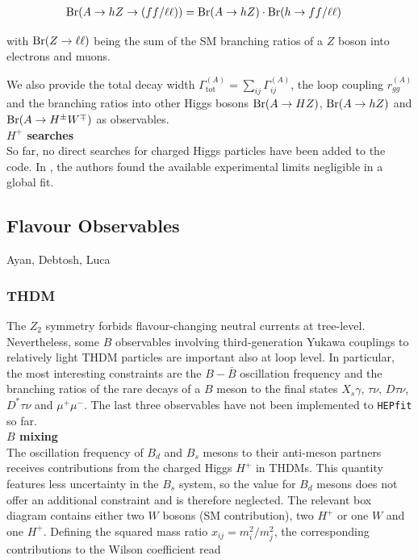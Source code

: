 \documentclass[aps,superscriptaddress,nofootinbib,floatfix,notitlepage]{revtex4-1}
\newcommand{\HEPfit}{\texttt{HEPfit}\xspace}
\begin{document}
\begin{align}
 {\rm Br}(A\to hZ\to (ff / \ell \ell )) &=  {\rm Br}(A\to hZ)  \cdot {\rm Br}(h\to ff / \ell \ell )\nonumber 
\end{align}

with ${\rm Br}(Z\to \ell \ell )$ being the sum of the SM branching ratios of a $Z$ boson into electrons and muons.

We also provide the total decay width $\Gamma^{(A)}_{\text{tot}}=\sum_{ij}\Gamma_{ij}^{(A)}$, the loop coupling $r_{gg}^{(A)}$ and the branching ratios into other Higgs bosons ${\rm Br}(A\to HZ)$, ${\rm Br}(A\to hZ)$ and ${\rm Br}(A\to H^\pm W^\mp)$ as observables.\\

\textbf{$H^+$ searches}\\

So far, no direct searches for charged Higgs particles have been added to the code. In \cite{Chowdhury:2015yja}, the authors found the available experimental limits negligible in a global fit.

\subsection{Flavour Observables}
\label{sec:Flavour}

Ayan, Debtosh, Luca

\subsubsection{THDM}

The $Z_2$ symmetry forbids flavour-changing neutral currents at tree-level. Nevertheless, some $B$ observables involving third-generation Yukawa couplings to relatively light THDM particles are important also at loop level. In particular, the most interesting constraints are the $B-\bar{B}$ oscillation frequency and the branching ratios of the rare decays of a $B$ meson to the final states $X_s \gamma$, $\tau \nu$, $D \tau \nu$, $D^* \tau \nu$ and $\mu^+\mu^-$. The last three observables have not been implemented to \HEPfit so far.\\

\textbf{$B$ mixing}\\

The oscillation frequency of $B_d$ and $B_s$ mesons to their anti-meson partners receives contributions from the charged Higgs $H^+$ in THDMs. This quantity features less uncertainty in the $B_s$ system, so the value for $B_d$ mesons does not offer an additional constraint and is therefore neglected. The relevant box diagram contains either two $W$ bosons (SM contribution), two $H^+$ or one $W$ and one $H^+$. Defining the squared mass ratio $x_{ij}=m_i^2/m_j^2$, the corresponding contributions to the Wilson coefficient read \cite{Geng:1988bq,Deschamps:2009rh}
\end{document}
